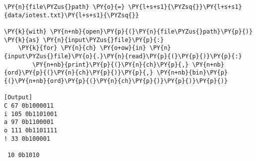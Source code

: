 \begin{Verbatim}[label=\makebox{\href{https://github.com/unipi-physics-labs/statnotes/tree/main/snippy/iotest.py}{https://github.com/.../iotest.py}},commandchars=\\\{\}]
\PY{n}{file\PYZus{}path} \PY{o}{=} \PY{l+s+s1}{\PYZsq{}}\PY{l+s+s1}{data/iotest.txt}\PY{l+s+s1}{\PYZsq{}}

\PY{k}{with} \PY{n+nb}{open}\PY{p}{(}\PY{n}{file\PYZus{}path}\PY{p}{)} \PY{k}{as} \PY{n}{input\PYZus{}file}\PY{p}{:}
    \PY{k}{for} \PY{n}{ch} \PY{o+ow}{in} \PY{n}{input\PYZus{}file}\PY{o}{.}\PY{n}{read}\PY{p}{(}\PY{p}{)}\PY{p}{:}
        \PY{n+nb}{print}\PY{p}{(}\PY{n}{ch}\PY{p}{,} \PY{n+nb}{ord}\PY{p}{(}\PY{n}{ch}\PY{p}{)}\PY{p}{,} \PY{n+nb}{bin}\PY{p}{(}\PY{n+nb}{ord}\PY{p}{(}\PY{n}{ch}\PY{p}{)}\PY{p}{)}\PY{p}{)}

[Output]
C 67 0b1000011
i 105 0b1101001
a 97 0b1100001
o 111 0b1101111
! 33 0b100001

 10 0b1010
\end{Verbatim}

